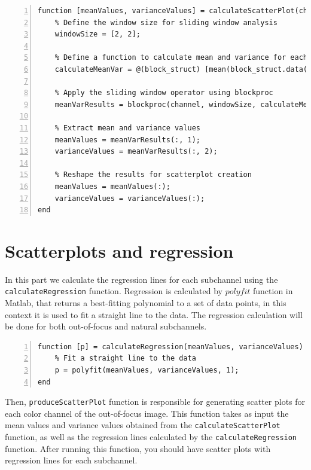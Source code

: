 \documentclass[12pt,a4paper,english
]{tunithesis}
\begin{document}
\begin{lstlisting}[style=Matlab-editor, numbers=left, basicstyle=\small]
% 4. Calculate scatter plots
function [meanValues, varianceValues] = calculateScatterPlot(channel)
    % Define the window size for sliding window analysis
    windowSize = [2, 2];

    % Define a function to calculate mean and variance for each window
    calculateMeanVar = @(block_struct) [mean(block_struct.data(:)), var(block_struct.data(:))];

    % Apply the sliding window operator using blockproc
    meanVarResults = blockproc(channel, windowSize, calculateMeanVar);

    % Extract mean and variance values
    meanValues = meanVarResults(:, 1);
    varianceValues = meanVarResults(:, 2);

    % Reshape the results for scatterplot creation
    meanValues = meanValues(:);
    varianceValues = varianceValues(:);
end
\end{lstlisting}

\section{Scatterplots and regression}
In this part we calculate the regression lines for each subchannel using the \texttt{calculateRegression} function. Regression is calculated by $polyfit$ function in Matlab, that returns a best-fitting polynomial to a set of data points, in this context it is used to fit a straight line to the data. The regression calculation will be done for both out-of-focus and natural subchannels.
\begin{lstlisting}[style=Matlab-editor, numbers=left, basicstyle=\small]
% 5. Calculate regression lines
function [p] = calculateRegression(meanValues, varianceValues)
    % Fit a straight line to the data
    p = polyfit(meanValues, varianceValues, 1);
end
\end{lstlisting}
Then,  \texttt{produceScatterPlot} function is responsible for generating scatter plots for each color channel of the out-of-focus image. This function takes as input the mean values and variance values obtained from the \texttt{calculateScatterPlot} function, as well as the regression lines calculated by the \texttt{calculateRegression} function. After running this function, you should have scatter plots with regression lines for each subchannel.
\end{document}
